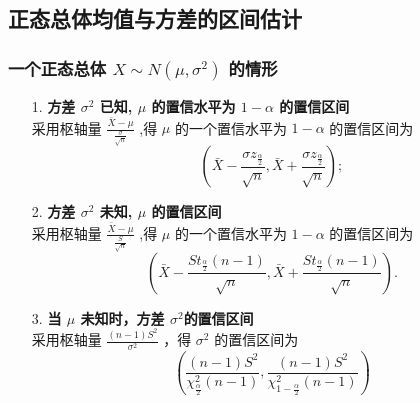 \documentclass[UTF8,10pt]{ctexart}
\begin{document}

	
	\subsection{正态总体均值与方差的区间估计}
	
	\subsubsection{一个正态总体 $ X \sim N ( \mu , \sigma ^{2}) $ 的情形}
	
	\begin{enumerate}
		\item [1.] \textbf{方差 $ \sigma ^{2} $ 已知, $ \mu $ 的置信水平为 $ 1- \alpha $ 的置信区间} \\ 采用枢轴量 $ \frac{ \bar{X} - \mu }{ \frac{ \sigma }{ \sqrt{n} } } $ ,得 $ \mu $ 的一个置信水平为 $ 1- \alpha $ 的置信区间为 $$ ( \bar{X} - \frac{ \sigma z_{ \frac{ \alpha }{2} } }{ \sqrt{n} }, \bar{X} + \frac{ \sigma z_{ \frac{ \alpha }{2} } }{ \sqrt{n} }); $$
		\item [2.] \textbf{方差 $ \sigma ^{2} $ 未知, $ \mu $ 的置信区间} \\ 采用枢轴量 $ \frac{ \bar{X} - \mu }{ \frac{ S }{ \sqrt{n} } } $ ,得 $ \mu $ 的一个置信水平为 $ 1- \alpha $ 的置信区间为 $$ ( \bar{X} - \frac{S t_{ \frac{ \alpha }{2} } (n-1)}{ \sqrt{n} } , \bar{X} + \frac{S t_{ \frac{ \alpha }{2} } (n-1)}{ \sqrt{n} } ). $$
		\item [3.] \textbf{当 $ \mu $ 未知时，方差 $ \sigma ^{2} $的置信区间} \\ 采用枢轴量 $ \frac{(n-1)S^{2}}{ \sigma ^{2}} $ ，得 $ \sigma ^{2} $ 的置信区间为 $$ ( \frac{(n-1)S^{2}}{ \chi _{ \frac{ \alpha }{2} }^{2}(n-1)} , \frac{(n-1)S^{2}}{ \chi _{1- \frac{ \alpha }{2} }^{2}(n-1)} ) $$
	\end{enumerate}
	
\end{document}
